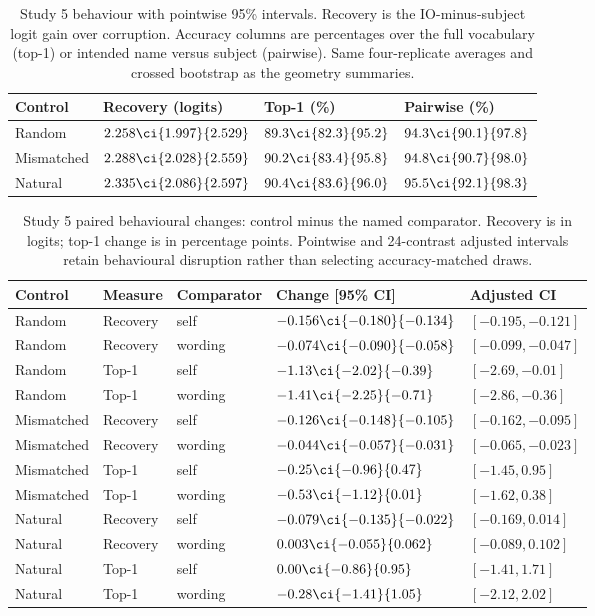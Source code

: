 \begin{table}[H]
\centering\footnotesize
\setlength{\tabcolsep}{3pt}
\caption{Study 5 behaviour with pointwise 95\% intervals. Recovery is the IO-minus-subject logit gain over corruption. Accuracy columns are percentages over the full vocabulary (top-1) or intended name versus subject (pairwise). Same four-replicate averages and crossed bootstrap as the geometry summaries.}
\label{tab:null-behaviour}
\begin{tabularx}{\linewidth}{@{}lYYY@{}}
\toprule
Control & Recovery (logits) & Top-1 (\%) & Pairwise (\%) \\
\midrule
Random & $2.258\ci{1.997}{2.529}$ & $89.3\ci{82.3}{95.2}$ & $94.3\ci{90.1}{97.8}$ \\
Mismatched & $2.288\ci{2.028}{2.559}$ & $90.2\ci{83.4}{95.8}$ & $94.8\ci{90.7}{98.0}$ \\
Natural & $2.335\ci{2.086}{2.597}$ & $90.4\ci{83.6}{96.0}$ & $95.5\ci{92.1}{98.3}$ \\
\bottomrule
\end{tabularx}
\end{table}

\begin{table}[H]
\centering\footnotesize
\setlength{\tabcolsep}{3pt}
\caption{Study 5 paired behavioural changes: control minus the named comparator. Recovery is in logits; top-1 change is in percentage points. Pointwise and 24-contrast adjusted intervals retain behavioural disruption rather than selecting accuracy-matched draws.}
\label{tab:null-behaviour-contrasts}
\begin{tabularx}{\linewidth}{@{}lYYYY@{}}
\toprule
Control & Measure & Comparator & Change [95\% CI] & Adjusted CI \\
\midrule
Random & Recovery & self & $-0.156\ci{-0.180}{-0.134}$ & $[-0.195, -0.121]$ \\
Random & Recovery & wording & $-0.074\ci{-0.090}{-0.058}$ & $[-0.099, -0.047]$ \\
Random & Top-1 & self & $-1.13\ci{-2.02}{-0.39}$ & $[-2.69, -0.01]$ \\
Random & Top-1 & wording & $-1.41\ci{-2.25}{-0.71}$ & $[-2.86, -0.36]$ \\
Mismatched & Recovery & self & $-0.126\ci{-0.148}{-0.105}$ & $[-0.162, -0.095]$ \\
Mismatched & Recovery & wording & $-0.044\ci{-0.057}{-0.031}$ & $[-0.065, -0.023]$ \\
Mismatched & Top-1 & self & $-0.25\ci{-0.96}{0.47}$ & $[-1.45, 0.95]$ \\
Mismatched & Top-1 & wording & $-0.53\ci{-1.12}{0.01}$ & $[-1.62, 0.38]$ \\
Natural & Recovery & self & $-0.079\ci{-0.135}{-0.022}$ & $[-0.169, 0.014]$ \\
Natural & Recovery & wording & $0.003\ci{-0.055}{0.062}$ & $[-0.089, 0.102]$ \\
Natural & Top-1 & self & $0.00\ci{-0.86}{0.95}$ & $[-1.41, 1.71]$ \\
Natural & Top-1 & wording & $-0.28\ci{-1.41}{1.05}$ & $[-2.12, 2.02]$ \\
\bottomrule
\end{tabularx}
\end{table}

